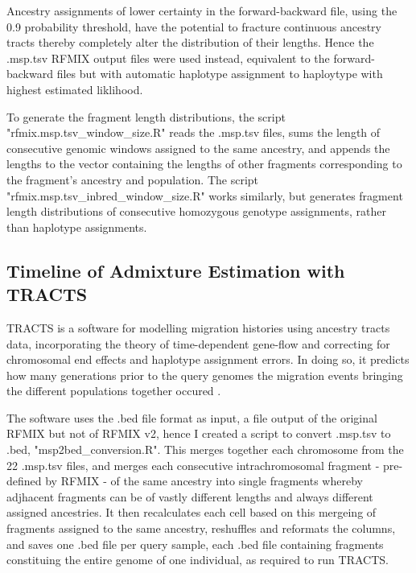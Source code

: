 \documentclass[11pt]{article}
\begin{document}
Ancestry assignments of lower certainty in the forward-backward file, using the 0.9 probability threshold, have the potential to fracture continuous ancestry tracts thereby completely alter the distribution of their lengths. Hence the .msp.tsv RFMIX output files were used instead, equivalent to the forward-backward files but with automatic haplotype assignment to haploytype with highest estimated liklihood.

To generate the fragment length distributions, the script "rfmix.msp.tsv\_window\_size.R" reads the .msp.tsv files, sums the length of consecutive genomic windows assigned to the same ancestry, and appends the lengths to the vector containing the lengths of other fragments corresponding to the fragment's ancestry and population. The script "rfmix.msp.tsv\_inbred\_window\_size.R" works similarly, but generates fragment length distributions of consecutive homozygous genotype assignments, rather than haplotype assignments. 





\subsection{Timeline of Admixture Estimation with TRACTS}

TRACTS is a software for modelling migration histories using ancestry tracts data, incorporating the theory of time-dependent gene-flow and correcting for chromosomal end effects and haplotype assignment errors. In doing so, it predicts how many generations prior to the query genomes the migration events bringing the different populations together occured \parencite{Gravel2012}.

The software uses the .bed file format as input, a file output of the original RFMIX but not of RFMIX v2, hence I created a script to convert .msp.tsv to .bed, "msp2bed\_conversion.R". This merges together each chromosome from the 22 .msp.tsv files, and merges each consecutive intrachromosomal fragment - pre-defined by RFMIX - of the same ancestry into single fragments whereby adjhacent fragments can be of vastly different lengths and always different assigned ancestries. It then recalculates each cell based on this mergeing of fragments assigned to the same ancestry, reshuffles and reformats the columns, and saves one .bed file per query sample, each .bed file containing fragments constituing the entire genome of one individual, as required to run TRACTS.
\end{document}
